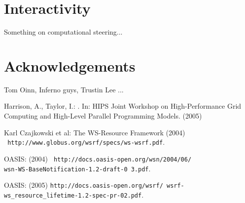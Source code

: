 \documentclass{llncs}
\begin{document}
\section{Interactivity} \label{sec:interactivity}

Something on computational steering...

\section*{Acknowledgements}
Tom Oinn, Inferno guys, Trustin Lee ...
%
%
\begin{thebibliography}{refs}

Harrison, A., Taylor, I.:
.
\newblock In: {HIPS Joint Workshop on High-Performance Grid Computing and
  High-Level Parallel Programming Models}. (2005)

{Karl Czajkowski et al}:
\newblock The {WS-Resource Framework} (2004) \\ {\tt
  http://www.globus.org/wsrf/specs/ws-wsrf.pdf}.

{OASIS}:
 (2004) {\tt
  http://docs.oasis-open.org/wsn/2004/06/\\wsn-WS-BaseNotification-1.2-draft-0%
3.pdf}.

{OASIS}:
 (2005) {\tt http://docs.oasis-open.org/wsrf/\
  wsrf-ws\_resource\_lifetime-1.2-spec-pr-02.pdf}.
%

\end{thebibliography}
\end{document}
